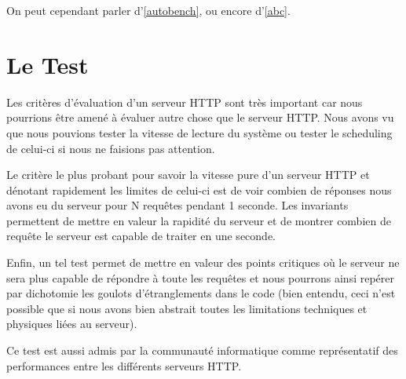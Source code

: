 \documentclass[a4paper, 11pt]{article}
\begin{document}
On peut cependant parler d'\ref{autobench}, ou encore d'\ref{abc}.

\section{Le Test}

Les  critères  d'évaluation  d'un serveur  HTTP  sont  très  important  car nous
pourrions être amené  à évaluer autre chose que le  serveur HTTP.  Nous avons vu
que  nous  pouvions  tester  la vitesse  de  lecture  du  système  ou  tester le
scheduling de celui-ci si nous ne faisions pas attention.

Le critère  le plus probant  pour savoir la  vitesse pure  d'un serveur  HTTP et
dénotant rapidement  les limites  de celui-ci  est de  voir combien  de réponses
nous avons  eu du  serveur pour  N requêtes  pendant 1  seconde.  Les invariants
permettent de mettre en  valeur la rapidité du serveur et  de montrer combien de
requête le serveur est capable de traiter en une seconde.

Enfin,  un tel test  permet  de  mettre  en  valeur  des  points critiques où le
serveur ne sera plus  capable de répondre à toute les  requêtes et nous pourrons
ainsi  repérer par  dichotomie les  goulots d'étranglements  dans le  code (bien
entendu,  ceci  n'est  possible  que si  nous  avons  bien  abstrait  toutes les
limitations techniques et physiques liées au serveur).

Ce test est  aussi admis par la communauté  informatique comme représentatif des
performances entre les différents serveurs HTTP\footnotemark[1].

\end{document}
